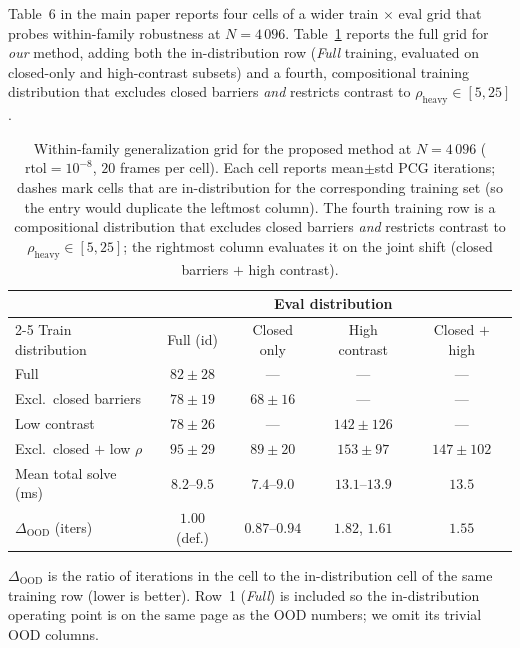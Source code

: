 \documentclass[acmtog,anonymous,review]{acmart}
\begin{document}
Table~6 in the main paper reports four cells of a wider train$\,\times\,$eval
grid that probes within-family robustness at $N\!=\!4\,096$.
Table~\ref{supp-tab:generalization} reports the full grid for \emph{our}
method, adding both the in-distribution row (\emph{Full} training,
evaluated on closed-only and high-contrast subsets) and a fourth,
compositional training distribution that excludes closed barriers
\emph{and} restricts contrast to $\rho_{\text{heavy}}\!\in\![5,25]$.

\begin{table}[H]
\centering
\caption{Within-family generalization grid for the proposed method at
$N\!=\!4\,096$ ($\mathrm{rtol}\!=\!10^{-8}$, $20$ frames per cell). Each cell
reports mean$\pm$std PCG iterations; dashes mark cells that are
in-distribution for the corresponding training set (so the entry would
duplicate the leftmost column). The fourth training row is a compositional
distribution that excludes closed barriers \emph{and} restricts contrast to
$\rho_{\text{heavy}}\!\in\![5,25]$; the rightmost column evaluates it on the
joint shift (closed barriers $+$ high contrast).}
\label{supp-tab:generalization}
\footnotesize\setlength{\tabcolsep}{4pt}
\begin{tabular}{@{}l cccc@{}}
\toprule
& \multicolumn{4}{c}{Eval distribution} \\
\cmidrule(lr){2-5}
Train distribution & Full (id) & Closed only & High contrast & Closed $+$ high \\
\midrule
Full                          & $82\!\pm\!28$  & ---            & ---             & ---             \\
Excl.\ closed barriers        & $78\!\pm\!19$  & $68\!\pm\!16$  & ---             & ---             \\
Low contrast                  & $78\!\pm\!26$  & ---            & $142\!\pm\!126$ & ---             \\
Excl.\ closed $+$ low $\rho$  & $95\!\pm\!29$  & $89\!\pm\!20$  & $153\!\pm\!97$  & $147\!\pm\!102$ \\
\midrule
Mean total solve (ms)         & $8.2$--$9.5$   & $7.4$--$9.0$   & $13.1$--$13.9$  & $13.5$          \\
$\Delta_{\text{OOD}}$ (iters) & $1.00$ (def.)  & $0.87$--$0.94$ & $1.82$, $1.61$  & $1.55$          \\
\bottomrule
\end{tabular}
\end{table}

\noindent
$\Delta_{\text{OOD}}$ is the ratio of iterations in the cell to the
in-distribution cell of the same training row (lower is better). Row~1
(\emph{Full}) is included so the in-distribution operating point is on the
same page as the OOD numbers; we omit its trivial OOD columns.
\end{document}
